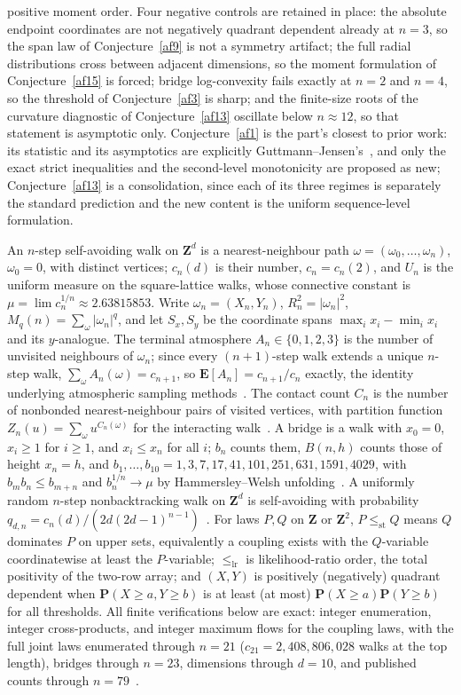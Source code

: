 \documentclass[11pt]{article}
\theoremstyle{definition}
\begin{document}
positive moment order.  Four negative controls are retained in place: the absolute endpoint coordinates are not negatively quadrant dependent already at $n=3$, so the span law of Conjecture~\ref{af9} is not a symmetry artifact; the full radial distributions cross between adjacent dimensions, so the moment formulation of Conjecture~\ref{af15} is forced; bridge log-convexity fails exactly at $n=2$ and $n=4$, so the threshold of Conjecture~\ref{af3} is sharp; and the finite-size roots of the curvature diagnostic of Conjecture~\ref{af13} oscillate below $n\approx12$, so that statement is asymptotic only.  Conjecture~\ref{af1} is the part's closest to prior work: its statistic and its asymptotics are explicitly Guttmann--Jensen's~\cite{GJ22}, and only the exact strict inequalities and the second-level monotonicity are proposed as new; Conjecture~\ref{af13} is a consolidation, since each of its three regimes is separately the standard prediction and the new content is the uniform sequence-level formulation.

An $n$-step self-avoiding walk on $\mathbf Z^d$ is a nearest-neighbour path $\omega=(\omega_0,\ldots,\omega_n)$, $\omega_0=0$, with distinct vertices; $c_n(d)$ is their number, $c_n=c_n(2)$, and $U_n$ is the uniform measure on the square-lattice walks, whose connective constant is $\mu=\lim c_n^{1/n}\approx2.63815853$.  Write $\omega_n=(X_n,Y_n)$, $R_n^2=|\omega_n|^2$, $M_q(n)=\sum_\omega|\omega_n|^q$, and let $S_x,S_y$ be the coordinate spans $\max_i x_i-\min_i x_i$ and its $y$-analogue.  The terminal atmosphere $A_n\in\{0,1,2,3\}$ is the number of unvisited neighbours of $\omega_n$; since every $(n+1)$-step walk extends a unique $n$-step walk, $\sum_\omega A_n(\omega)=c_{n+1}$, so $\mathbf E[A_n]=c_{n+1}/c_n$ exactly, the identity underlying atmospheric sampling methods~\cite{RJvR08,OP08}.  The contact count $C_n$ is the number of nonbonded nearest-neighbour pairs of visited vertices, with partition function $Z_n(u)=\sum_\omega u^{C_n(\omega)}$ for the interacting walk~\cite{BOS01,BGJ20}.  A bridge is a walk with $x_0=0$, $x_i\ge1$ for $i\ge1$, and $x_i\le x_n$ for all $i$; $b_n$ counts them, $B(n,h)$ counts those of height $x_n=h$, and $b_1,\ldots,b_{10}=1,3,7,17,41,101,251,631,1591,4029$, with $b_mb_n\le b_{m+n}$ and $b_n^{1/n}\to\mu$ by Hammersley--Welsh unfolding~\cite{HW62}.  A uniformly random $n$-step nonbacktracking walk on $\mathbf Z^d$ is self-avoiding with probability $q_{d,n}=c_n(d)/(2d(2d-1)^{n-1})$~\cite{FvdH13}.  For laws $P,Q$ on $\mathbf Z$ or $\mathbf Z^2$, $P\le_{\mathrm{st}}Q$ means $Q$ dominates $P$ on upper sets, equivalently a coupling exists with the $Q$-variable coordinatewise at least the $P$-variable; $\le_{\mathrm{lr}}$ is likelihood-ratio order, the total positivity of the two-row array; and $(X,Y)$ is positively (negatively) quadrant dependent when $\mathbf P(X\ge a,Y\ge b)$ is at least (at most) $\mathbf P(X\ge a)\mathbf P(Y\ge b)$ for all thresholds.  All finite verifications below are exact: integer enumeration, integer cross-products, and integer maximum flows for the coupling laws, with the full joint laws enumerated through $n=21$ ($c_{21}=2{,}408{,}806{,}028$ walks at the top length), bridges through $n=23$, dimensions through $d=10$, and published counts through $n=79$~\cite{Jen13}.
\end{document}
